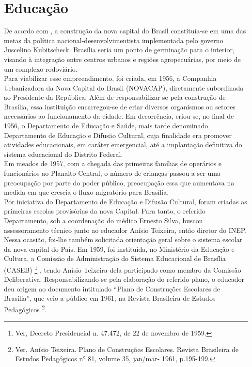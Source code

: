 \section{Educação}

De acordo com , a construção da nova capital do Brasil constituía-se em uma das metas da
política nacional-desenvolvimentista implementada pelo governo Juscelino
Kubitscheck. Brasília seria um ponto de germinação para o interior, visando à
integração entre centros urbanos e regiões agropecuárias, por meio de um complexo
rodoviário.\\

Para viabilizar esse empreendimento, foi criada, em 1956, a Companhia
Urbanizadora da Nova Capital do Brasil (NOVACAP), diretamente subordinada ao
Presidente da República. Além de responsabilizar-se pela construção de Brasília, essa
instituição encarregou-se de criar diversos organismos ou setores necessários ao
funcionamento da cidade. Em decorrência, criou-se, no final de 1956, o Departamento
de Educação e Saúde, mais tarde denominado Departamento de Educação e Difusão
Cultural, cuja finalidade era promover atividades educacionais, em caráter emergencial,
até a implantação definitiva do sistema educacional do Distrito Federal.\\

Em meados de 1957, com a chegada das primeiras famílias de operários e
funcionários ao Planalto Central, o número de crianças passou a ser uma preocupação
por parte do poder público, preocupação essa que aumentava na medida em que crescia
o fluxo migratório para Brasília.\\

Por iniciativa do Departamento de Educação e Difusão Cultural, foram criadas
as primeiras escolas provisórias da nova Capital. Para tanto, o referido Departamento,
sob a coordenação do médico Ernesto Silva, buscou assessoramento técnico junto ao
educador Anísio Teixeira, então diretor do INEP. Nessa ocasião, foi-lhe também
solicitada orientação geral sobre o sistema escolar da nova capital do País.
Em 1959, foi instituída, no Ministério da Educação e Cultura, a Comissão de
Administração do Sistema Educacional de Brasília (CASEB) \footnote{Ver, Decreto Presidencial n. 47.472, de 22 de novembro de 1959.} , tendo Anísio Teixeira
dela participado como membro da Comissão Deliberativa. Responsabilizando-se pela
elaboração do referido plano, o educador deu origem ao documento intitulado “Plano de
Construções Escolares de Brasília”, que veio a público em 1961, na Revista Brasileira
de Estudos Pedagógicos \footnote{Ver, Anísio Teixeira. Plano de Construções Escolares. Revista Brasileira de Estudos Pedagógicos n° 81, volume 35, jan/mar- 1961, p.195-199.}.

